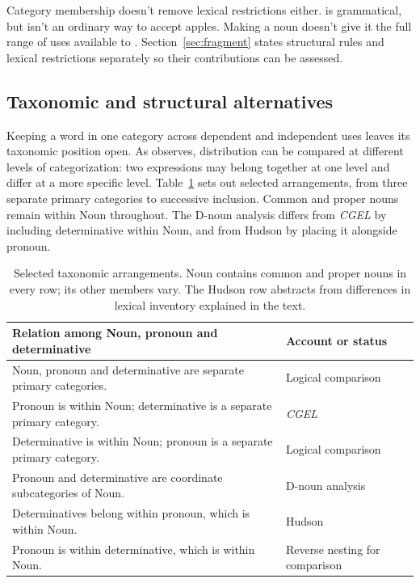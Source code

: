 \documentclass[12pt]{article}
\begin{document}
Category membership doesn't remove lexical restrictions either.  is grammatical, but  isn't an ordinary way to accept apples. Making  a noun doesn't give it the full range of uses available to . Section~\ref{sec:fragment} states structural rules and lexical restrictions separately so their contributions can be assessed.

\subsection{Taxonomic and structural alternatives}\label{sec:related}

Keeping a word in one category across dependent and independent uses leaves its taxonomic position open. As \textcite[232--235]{lyons1968} observes, distribution can be compared at different levels of categorization: two expressions may belong together at one level and differ at a more specific level. Table~\ref{tab:rivals} sets out selected arrangements, from three separate primary categories to successive inclusion. Common and proper nouns remain within Noun throughout. The D-noun analysis differs from \textit{CGEL} by including determinative within Noun, and from Hudson by placing it alongside pronoun.

\begin{table}[H]
\centering\small
\caption{Selected taxonomic arrangements. Noun contains common and proper nouns in every row; its other members vary. The Hudson row abstracts from differences in lexical inventory explained in the text.}\label{tab:rivals}
\begin{tabular}{>{\raggedright\arraybackslash}p{8.7cm}>{\raggedright\arraybackslash}p{3cm}}
\toprule
Relation among Noun, pronoun and determinative & Account or status \\
\midrule
Noun, pronoun and determinative are separate primary categories. & Logical comparison \\
Pronoun is within Noun; determinative is a separate primary category. & \textit{CGEL} \\
Determinative is within Noun; pronoun is a separate primary category. & Logical comparison \\
Pronoun and determinative are coordinate subcategories of Noun. & D-noun analysis \\
Determinatives belong within pronoun, which is within Noun. & Hudson \\
Pronoun is within determinative, which is within Noun. & Reverse nesting for comparison \\
\bottomrule
\end{tabular}
\end{table}
\end{document}
